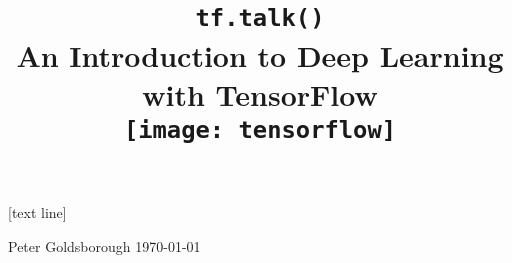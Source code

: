 





{
[text line]{%
  \parbox{\linewidth}{%
    \vspace*{-20pt}%
    \footnotesize Peter Goldsborough\hspace{5.2cm} {\today}}%
}

\begin{frame}
    \title{
      \vspace{1.6cm}\\
      {\Huge \texttt{tf.talk()}}\\
      \vspace{0.75cm}
      An Introduction to Deep Learning\\ with TensorFlow\\
      \vspace{0.75cm}
      \texttt{[image: tensorflow]}}
      \date{}
    \titlepage
\end{frame}
}

\addtocounter{framenumber}{-1}


%
%


%
%



% 


